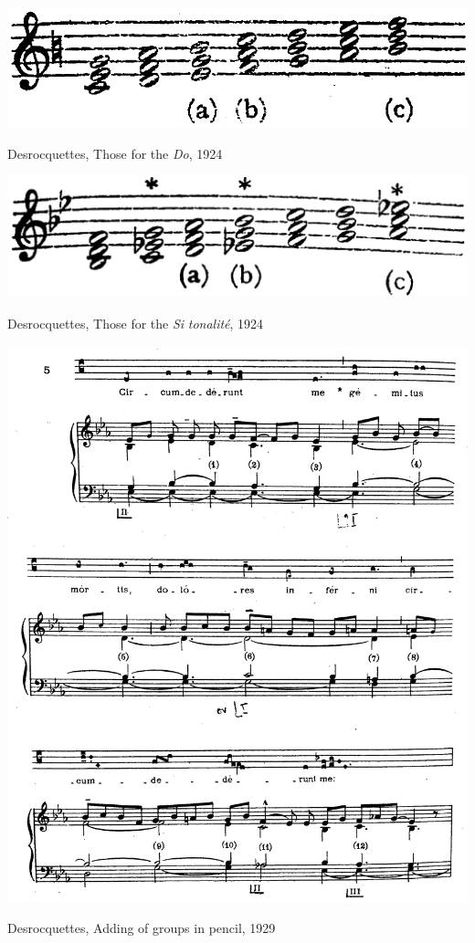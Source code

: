 \begin{example}
  \centering
  \includegraphics[width=.7\linewidth]{c/4/ex/dd_cscale.png}
  \caption{Desrocquettes, Those for the \emph{Do}, 1924}
  \label{mus:dd_cscale}
\end{example}

\vspace*{\fill}

\begin{example}
  \centering
  \includegraphics[width=.7\linewidth]{c/4/ex/dd_bflatscale.png}
  \caption{Desrocquettes, Those for the \emph{Si}\kern 1pt\flat{} \emph{tonalité}, 1924}
  \label{mus:dd_bflatscale}
\end{example}

\vspace*{\fill}

\newpage

\vspace*{\fill}

\begin{example}
  \centering
  \includegraphics[width=.9\linewidth]{c/4/ex/potirondesrocquettes_29pieces.jpg}
  \caption{Desrocquettes, Adding of groups in pencil, 1929}
  \label{mus:potirondesrocquettes_29pieces}
\end{example}

